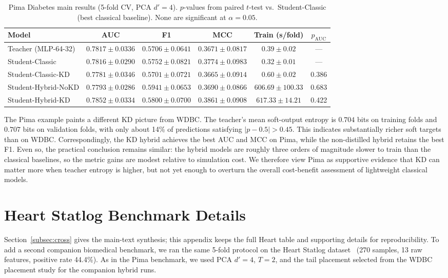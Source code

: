 \documentclass[11pt,a4paper]{article}
\begin{document}
\begin{table}[t]
\caption{Pima Diabetes main results (5-fold CV, PCA $d'=4$). $p$-values from paired $t$-test vs.\ Student-Classic (best classical baseline). None are significant at $\alpha{=}0.05$.}
\label{tab:pima_main}
\centering\small
\setlength{\tabcolsep}{4pt}
\begin{tabular}{lccccc}
\toprule
Model & AUC & F1 & MCC & Train (s/fold) & $p_{\text{AUC}}$ \\
\midrule
Teacher (MLP-64-32) & $0.7817 \pm 0.0336$ & $0.5706 \pm 0.0641$ & $0.3671 \pm 0.0817$ & $0.39 \pm 0.02$ & --- \\
\midrule
Student-Classic     & $0.7816 \pm 0.0290$ & $0.5752 \pm 0.0821$ & $0.3774 \pm 0.0983$ & $0.32 \pm 0.01$ & --- \\
Student-Classic-KD  & $0.7781 \pm 0.0346$ & $0.5701 \pm 0.0721$ & $0.3665 \pm 0.0914$ & $0.60 \pm 0.02$ & 0.386 \\
Student-Hybrid-NoKD & $0.7793 \pm 0.0286$ & $0.5941 \pm 0.0653$ & $0.3690 \pm 0.0866$ & $606.69 \pm 100.33$ & 0.683 \\
Student-Hybrid-KD   & $0.7852 \pm 0.0334$ & $0.5800 \pm 0.0700$ & $0.3861 \pm 0.0908$ & $617.33 \pm 14.21$ & 0.422 \\
\bottomrule
\end{tabular}
\end{table}

The Pima example paints a different KD picture from WDBC. The teacher's mean soft-output entropy is
$0.704$ bits on training folds and $0.707$ bits on validation folds, with only about 14\% of
predictions satisfying $|p-0.5|>0.45$. This indicates substantially richer soft targets than on
WDBC. Correspondingly, the KD hybrid achieves the best AUC and MCC on Pima, while the non-distilled
hybrid retains the best F1. Even so, the practical conclusion remains similar: the hybrid models are
roughly three orders of magnitude slower to train than the classical baselines, so the metric gains
are modest relative to simulation cost. We therefore view Pima as supportive evidence that KD can
matter more when teacher entropy is higher, but not yet enough to overturn the overall cost-benefit
assessment of lightweight classical models.

\section{Heart Statlog Benchmark Details}
\label{app:heart}

Section~\ref{subsec:cross} gives the main-text synthesis; this appendix keeps the full Heart table
and supporting details for reproducibility. To add a second companion biomedical benchmark, we
ran the same 5-fold protocol on the Heart Statlog dataset~\cite{heart} (270 samples, 13 raw
features, positive rate 44.4\%). As in the Pima benchmark, we used PCA $d'=4$, $T=2$, and the tail
placement selected from the WDBC placement study for the companion hybrid runs.
\end{document}
